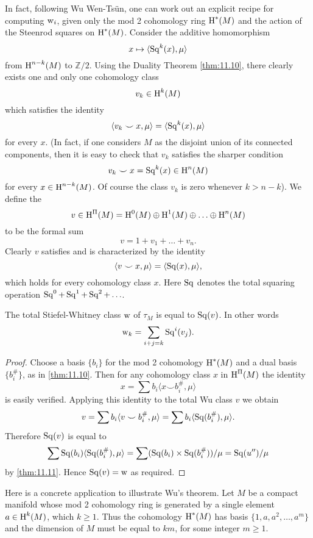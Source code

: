 \documentclass[../main]{subfiles}
\begin{document}
In fact, following Wu Wen-Tsün, one can work out an explicit recipe for computing $\operatorname{w}_i$, given only the mod 2 cohomology ring $\operatorname{H}^\ast(M)$ and the action of the Steenrod squares on $\operatorname{H}^\ast(M)$. Consider the additive homomorphism
\[
x\mapsto \langle \operatorname{Sq}^k(x),\mu \rangle
\]
from $\operatorname{H}^{n-k}(M)$ to $\mathbb Z/2$. Using the Duality Theorem \ref{thm:11.10}, there clearly exists one and only one cohomology class
\[
v_k\in \operatorname{H}^k(M)
\]
which satisfies the identity
\[
\langle v_k\smile x,\mu \rangle = \langle \operatorname{Sq}^k(x), \mu\rangle
\]
for every $x$. (In fact, if one considers $M$ as the disjoint union of its connected components, then it is easy to check that $v_k$ satisfies the sharper condition
\[
v_k \smile x = \operatorname{Sq}^k(x) \in \operatorname{H}^n(M)
\]
for every $x\in \operatorname{H}^{n-k}(M)$. Of course the class $v_k$ is zero whenever $k>n-k$). We define the 
\[
v\in \operatorname{H}^\Pi(M)
=
\operatorname{H}^0(M)
\oplus
\operatorname{H}^1(M)
\oplus
\hdots
\oplus
\operatorname{H}^n(M)
\]
to be the formal sum
\[
v = 1 + v_1 + \hdots + v_n.
\]
Clearly $v$ satisfies and is characterized by the identity
\[
\langle v \smile x, \mu \rangle
=
\langle \operatorname{Sq}(x), \mu \rangle,
\]
which holds for every cohomology class $x$. Here $\operatorname{Sq}$ denotes the total squaring operation $\operatorname{Sq}^0+\operatorname{Sq}^1+\operatorname{Sq}^2+\hdots$.

\begin{theorem}[Wu]
\label{thm:11.14}
The total Stiefel-Whitney class $\operatorname{w}$ of $\tau_M$ is equal to $\operatorname{Sq}(v)$. In other words
\[
\operatorname{w}_k
=
\sum_{i+j=k} \operatorname{Sq}^i(v_j).
\]
\end{theorem}
\begin{proof}
Choose a basis $\{b_i\}$ for the mod 2 cohomology $\operatorname{H}^\ast(M)$ and a dual basis $\{b_i^\#\}$, as in \ref{thm:11.10}. Then for any cohomology class $x$ in $\operatorname{H}^\Pi(M)$ the identity
\[
x = \sum b_i \langle x\smile b_i^\#, \mu \rangle
\]
is easily verified. Applying this identity to the total Wu class $v$ we obtain
\[
v
=
\sum b_i \langle v\smile b_i^\#, \mu \rangle
=
\sum b_i \langle \operatorname{Sq}(b_i^\#), \mu \rangle.
\]
Therefore $\operatorname{Sq}(v)$ is equal to
\[
\sum \operatorname{Sq}(b_i)  \langle \operatorname{Sq}(b_i^\#), \mu \rangle
=
\sum (\operatorname{Sq}(b_i)\times \operatorname{Sq}(b_i^\#))/\mu
=
\operatorname{Sq}(u'')/\mu
\]
by \ref{thm:11.11}. Hence $\operatorname{Sq}(v)=\operatorname{w}$ as required.
\end{proof}

Here is a concrete application to illustrate Wu's theorem. Let $M$ be a compact manifold whose mod 2 cohomology ring is generated by a single element \newline $a\in \operatorname{H}^k(M)$, which $k\geq 1$. Thus the cohomology $\operatorname{H}^\ast(M)$ has basis $\{1, a, a^2, \hdots, a^m\}$ and the dimension of $M$ must be equal to $km$, for some integer $m \geq 1$.
\end{document}
